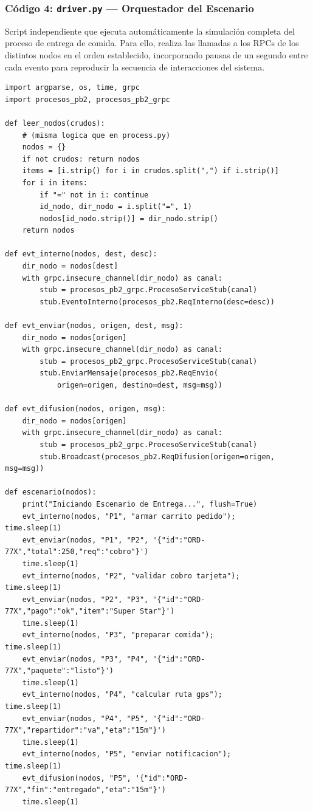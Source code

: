 \documentclass[letterpaper,11pt]{article}
\begin{document}
\subsubsection{Código 4: \texttt{driver.py} — Orquestador del Escenario}

Script independiente que ejecuta automáticamente la simulación completa
del proceso de entrega de comida. Para ello, realiza las llamadas a los
RPCs de los distintos nodos en el orden establecido, incorporando pausas
de un segundo entre cada evento para reproducir la secuencia de
interacciones del sistema.


\begin{lstlisting}[style=python, caption={driver.py — Orquestador del escenario de entrega}]
import argparse, os, time, grpc
import procesos_pb2, procesos_pb2_grpc
 
def leer_nodos(crudos):
    # (misma logica que en process.py)
    nodos = {}
    if not crudos: return nodos
    items = [i.strip() for i in crudos.split(",") if i.strip()]
    for i in items:
        if "=" not in i: continue
        id_nodo, dir_nodo = i.split("=", 1)
        nodos[id_nodo.strip()] = dir_nodo.strip()
    return nodos
 
def evt_interno(nodos, dest, desc):
    dir_nodo = nodos[dest]
    with grpc.insecure_channel(dir_nodo) as canal:
        stub = procesos_pb2_grpc.ProcesoServiceStub(canal)
        stub.EventoInterno(procesos_pb2.ReqInterno(desc=desc))
 
def evt_enviar(nodos, origen, dest, msg):
    dir_nodo = nodos[origen]
    with grpc.insecure_channel(dir_nodo) as canal:
        stub = procesos_pb2_grpc.ProcesoServiceStub(canal)
        stub.EnviarMensaje(procesos_pb2.ReqEnvio(
            origen=origen, destino=dest, msg=msg))
 
def evt_difusion(nodos, origen, msg):
    dir_nodo = nodos[origen]
    with grpc.insecure_channel(dir_nodo) as canal:
        stub = procesos_pb2_grpc.ProcesoServiceStub(canal)
        stub.Broadcast(procesos_pb2.ReqDifusion(origen=origen, msg=msg))
 
def escenario(nodos):
    print("Iniciando Escenario de Entrega...", flush=True)
    evt_interno(nodos, "P1", "armar carrito pedido");           time.sleep(1)
    evt_enviar(nodos, "P1", "P2", '{"id":"ORD-77X","total":250,"req":"cobro"}')
    time.sleep(1)
    evt_interno(nodos, "P2", "validar cobro tarjeta");          time.sleep(1)
    evt_enviar(nodos, "P2", "P3", '{"id":"ORD-77X","pago":"ok","item":"Super Star"}')
    time.sleep(1)
    evt_interno(nodos, "P3", "preparar comida");                time.sleep(1)
    evt_enviar(nodos, "P3", "P4", '{"id":"ORD-77X","paquete":"listo"}')
    time.sleep(1)
    evt_interno(nodos, "P4", "calcular ruta gps");              time.sleep(1)
    evt_enviar(nodos, "P4", "P5", '{"id":"ORD-77X","repartidor":"va","eta":"15m"}')
    time.sleep(1)
    evt_interno(nodos, "P5", "enviar notificacion");            time.sleep(1)
    evt_difusion(nodos, "P5", '{"id":"ORD-77X","fin":"entregado","eta":"15m"}')
    time.sleep(1)
\end{lstlisting}
\end{document}
